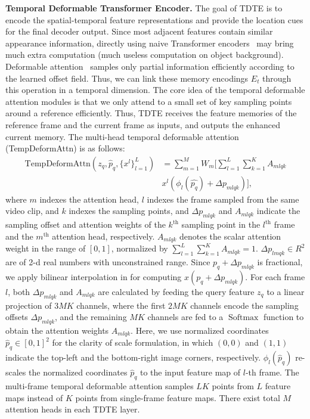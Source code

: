 \documentclass[10pt,journal,compsoc]{IEEEtran}
\begin{document}
\vspace{-4mm}
\noindent
\textbf{Temporal Deformable Transformer Encoder.}
The goal of TDTE is to encode the spatial-temporal feature representations and provide the location cues for the final decoder output. Since most adjacent features contain similar appearance information, directly using naive Transformer encoders~\cite{detr,Vaswani17attention} may bring much extra computation (much useless computation on object background). Deformable attention~\cite{zhu2020deformable} samples only partial information efficiently according to the learned offset field. Thus, we can link these memory encodings $E_{t}$ through this operation in a temporal dimension. The core idea of the temporal deformable attention modules is that we only attend to a small set of key sampling points around a reference efficiently.  Thus, TDTE receives the feature memories of the reference frame and the current frame as inputs, and outputs the enhanced current memory. The multi-head temporal deformable attention (TempDeformAttn) is as follows:
\begin{align}
    \text{TempDeformAttn}(z_q, \hat{p}_q, \{x^l\}_{l=1}^{L}) &=\sum_{m=1}^{M} W_m \big[\sum_{l=1}^{L} \sum_{k=1}^{K} A_{mlqk} \nonumber \\
    & x^l(\phi_l(\hat{p_q}) + \Delta p_{mlqk} )\big], \label{eq:def-attention}
\end{align}
where $m$ indexes the attention head, $l$ indexes the frame sampled from the same video clip, and $k$ indexes the sampling points, and $\Delta p_{mlqk}$ and $A_{mlqk}$ indicate the sampling offset and attention weights of the $k^\text{th}$ sampling point in the $l^\text{th}$ frame and the $m^\text{th}$ attention head, respectively.
$A_{mlqk}$ denotes the scalar attention weight in the range of $[0, 1]$, normalized by $\sum_{l=1}^{L} \sum_{k=1}^{K} A_{mlqk} = 1$. $\Delta p_{lmqk} \in R^2$ are of 2-d real numbers with unconstrained range. Since $p_q + \Delta p_{mlqk}$ is
fractional, we apply bilinear interpolation in \cite{dai2017deformable} for computing $x(p_q + \Delta p_{mlqk})$.
For each frame $l$, both $\Delta p_{mlqk}$ and $A_{mlqk}$ are calculated by feeding the query feature $z_q$ to a linear projection of $3MK$ channels, where the first $2MK$ channels encode the sampling offsets $\Delta p_{mlqk}$, and the remaining $MK$ channels are fed to a $\operatorname{Softmax}$ function to obtain the attention weights $A_{mlqk}$.
Here, we use normalized coordinates $\hat{p}_q \in [0, 1]^2$ for the clarity of scale formulation, in which  $(0, 0)$ and $(1, 1)$ indicate the top-left and the bottom-right image corners, respectively. $\phi_{l}(\hat{p}_q)$  re-scales the normalized coordinates $\hat{p}_q$ to the input feature map of  $l$-th frame. The multi-frame temporal deformable attention samples $LK$ points from $L$ feature maps instead of $K$ points from single-frame feature maps. There exist total $M$ attention heads in each TDTE layer.
\end{document}
